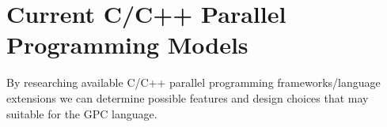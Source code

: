 \section{Current C/C++ Parallel Programming Models}

By researching available C/C++ parallel programming frameworks/language extensions 
we can determine possible features and design choices that may suitable for the GPC language.




